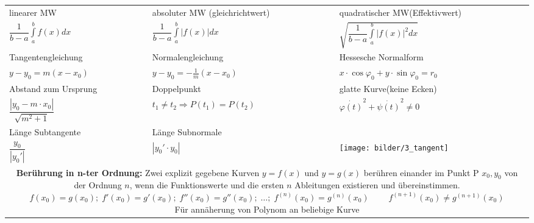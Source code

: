 	
\begin{table}[h!]
\begin{center}


\begin{tabularx}{540pt}{|p{160pt}|p{180pt}|X|}
\hline
\rowcolor{Gray}
\multicolumn{3}{|c|}{\textbf{Gleichungen}}\\
	\hline
	linearer MW & absoluter MW (gleichrichtwert)  & quadratischer MW(Effektivwert) \\
	
	$\dfrac{1}{b-a}\int\limits_a^b f(x)dx$&
	$\dfrac{1}{b-a}\int\limits_a^b |f(x)|dx$&
	$\sqrt{\dfrac{1}{b-a} \int\limits_a^b |f(x)|^2 dx}$\\
	\hline

Tangentengleichung & Normalengleichung  & Hessesche Normalform \\

$y-y_0=m(x-x_0)$ &
$y-y_0=-\frac{1}{m}(x-x_0)$ &
$x\cdot \cos\varphi_0 +y\cdot \sin\varphi_0=r_0$ \\
\hline

Abstand zum Ursprung& Doppelpunkt& glatte Kurve(keine Ecken)\\

$\dfrac{|y_0 - m \cdot x_0|}{\sqrt{m^2 + 1}}$ &
$t_1 \neq t_2 \Rightarrow P(t_1)=P(t_2)$&
$\dot{\varphi(t)}^2+\dot{\psi(t)}^2\neq 0$\\
\hline

Länge Subtangente & Länge Subnormale& \\

$\dfrac{y_0}{|y_0'|}$&
$|y_0' \cdot y_0|$&
\texttt{[image: bilder/3\_tangent]}\\
\hline

\multicolumn{3}{|c|}{
\parbox{450pt}{\textbf{Berührung in n-ter Ordnung:} Zwei explizit gegebene Kurven $y = f(x)$ und $y = g(x)$ berühren einander im
Punkt P $x_0, y_0$ von der Ordnung $n$, wenn die Funktionswerte und die ersten
$n$ Ableitungen existieren und übereinstimmen.\\
$f(x_0) = g(x_0);\; f'(x_0) = g'(x_0);\; f''(x_0) = g''(x_0);\;\ldots ;
\;f^{(n)}(x_0) = g^{(n)}(x_0)\; \qquad f^{(n+1)}(x_0) \neq g^{(n+1)}(x_0)$\\
Für annäherung von Polynom an beliebige Kurve}}\\
\hline
\end{tabularx}


\end{center}
\end{table}
